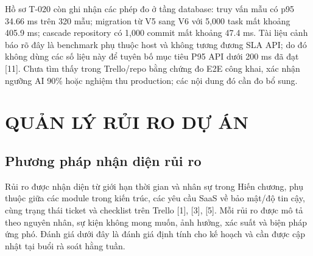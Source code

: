 \documentclass[12pt,a4paper]{report}
\begin{document}
Hồ sơ T-020 còn ghi nhận các phép đo ở tầng database: truy vấn mẫu có p95 34.66 ms trên 320 mẫu; migration từ V5 sang V6 với 5,000 task mất khoảng 405.9 ms; cascade repository có 1,000 commit mất khoảng 47.4 ms. Tài liệu cảnh báo rõ đây là benchmark phụ thuộc host và không tương đương SLA API; do đó không dùng các số liệu này để tuyên bố mục tiêu P95 API dưới 200 ms đã đạt [11]. Chưa tìm thấy trong Trello/repo bằng chứng đo E2E công khai, xác nhận ngưỡng AI 90\% hoặc nghiệm thu production; các nội dung đó cần đo bổ sung.

\chapter{QUẢN LÝ RỦI RO DỰ ÁN}
\section{Phương pháp nhận diện rủi ro}
Rủi ro được nhận diện từ giới hạn thời gian và nhân sự trong Hiến chương, phụ thuộc giữa các module trong kiến trúc, các yêu cầu SaaS về bảo mật/độ tin cậy, cùng trạng thái ticket và checklist trên Trello [1], [3], [5]. Mỗi rủi ro được mô tả theo nguyên nhân, sự kiện không mong muốn, ảnh hưởng, xác suất và biện pháp ứng phó. Đánh giá dưới đây là đánh giá định tính cho kế hoạch và cần được cập nhật tại buổi rà soát hằng tuần.
\end{document}
